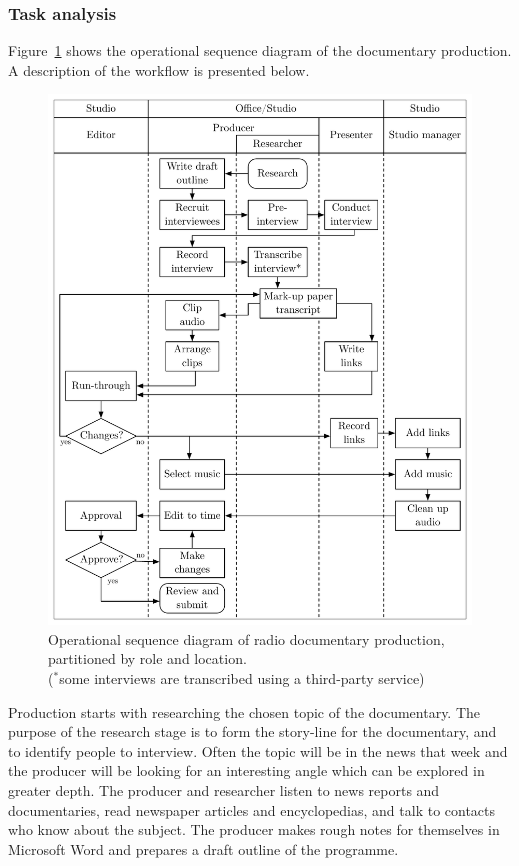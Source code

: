 \subsubsection{Task analysis}
Figure~\ref{fig:ethno-docs-workflow} shows the operational sequence diagram of the documentary production.  A
description of the workflow is presented below.

\begin{figure}
  \centering
  \includegraphics[width=4.5in]{figs/docs-workflow.pdf}
  \caption{Operational sequence diagram of radio documentary production, partitioned by role and location.\\
  {\footnotesize ($^{*}$some interviews are transcribed using a third-party service)}}
  \label{fig:ethno-docs-workflow}
\end{figure}

Production starts with researching the chosen topic of the documentary.  The purpose of the research stage is to form
the story-line for the documentary, and to identify people to interview.  Often the topic will be in the news that week
and the producer will be looking for an interesting angle which can be explored in greater depth.  The producer and
researcher listen to news reports and documentaries, read newspaper articles and encyclopedias, and talk to contacts
who know about the subject.  The producer makes rough notes for themselves in Microsoft Word and prepares a draft
outline of the programme.

